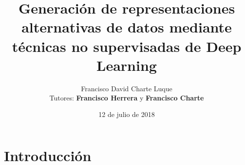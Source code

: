

\title{Generación de representaciones alternativas de datos mediante técnicas no supervisadas de Deep Learning}
\date{12 de julio de 2018}
\author{Francisco David Charte Luque\\\scriptsize Tutores: \textbf{Francisco Herrera} y \textbf{Francisco Charte}\\}


\begin{frame}[plain]
\maketitle
\end{frame}

\section{Introducción}

